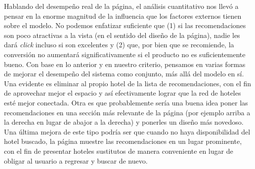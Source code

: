 \documentclass[12pt]{report}
\begin{document}
Hablando del desempeño real de la página, el análisis cuantitativo nos llevó a pensar en la enorme magnitud de la influencia que los factores externos tienen sobre el modelo. No podemos enfatizar suficiente que (1) si las recomendaciones son poco atractivas a la vista (en el sentido del diseño de la página), nadie les dará \emph{click} incluso si son excelentes y (2) que, por bien que se recomiende, la conversión no aumentará significativamente si el producto no es suficientemente bueno. Con base en lo anterior y en nuestro criterio, pensamos en varias formas de mejorar el desempeño del sistema como conjunto, más allá del modelo en sí. Una evidente es eliminar al propio hotel de la lista de recomendaciones, con el fin de aprovechar mejor el espacio y así efectivamente lograr que la red de hoteles esté mejor conectada. Otra es que probablemente sería una buena idea poner las recomendaciones en una sección más relevante de la página (por ejemplo arriba a la derecha en lugar de abajor a la derecha) y ponerles un diseño más novedoso. Una última mejora de este tipo podría ser que cuando no haya disponibilidad del hotel buscado, la página muestre las recomendaciones en un lugar prominente, con el fin de presentar hoteles sustitutos de manera conveniente en lugar de obligar al usuario a regresar y buscar de nuevo.







\printnoidxglossaries




%
\end{document}
